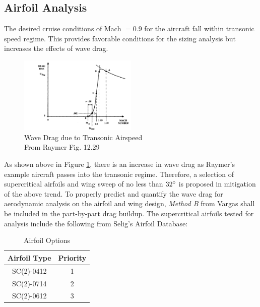 \subsection{Airfoil Analysis}
The desired cruise conditions of Mach $= 0.9$ for the aircraft fall within transonic speed regime.  This provides favorable conditions for the sizing analysis but increases the effects of wave drag.

\begin{figure}
    \vspace{-0.25in}
    \centering
    \includegraphics[width=0.5\textwidth]{Photos/wavedragduetotransonic.png}
    \caption{Wave Drag due to Transonic Airspeed\\{\small From Raymer Fig. 12.29\cite{raymer}}}
    \label{fig:transonic}
    \vspace{-0.5in}
\end{figure}

As shown above in Figure \ref{fig:transonic}, there is an increase in wave drag as Raymer's example aircraft passes into the transonic regime.  Therefore, a selection of supercritical airfoils and wing sweep of no less than $32\degree$ is proposed in mitigation of the above trend.  To properly predict and quantify the wave drag for aerodynamic analysis on the airfoil and wing design, \textit{Method B} from Vargas\cite{vargas} shall be included in the part-by-part drag buildup.  The supercritical airfoils tested for analysis include the following from Selig's Airfoil Database:

\begin{table}[!h]
    \centering
    \caption{Airfoil Options}
    \begin{tabular}{|c|c|} \toprule
        \textbf{Airfoil Type} & \textbf{Priority} \\ \hline \hline
        SC(2)-0412 & 1 \\ \hline
        SC(2)-0714 & 2 \\ \hline
        SC(2)-0612 & 3 \\ \hline
    \end{tabular}
    \label{tab:my_label}
\end{table}

